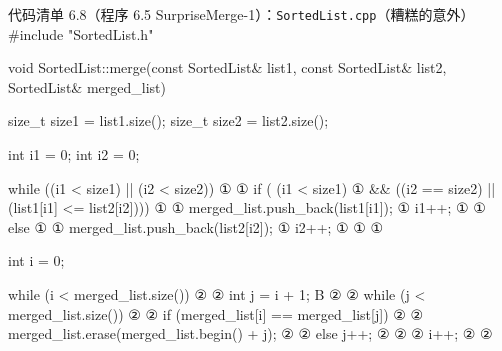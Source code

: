 \begin{codeboxt}{代码清单 6.8（程序 6.5 SurpriseMerge-1）：\texttt{Sorted\allowbreak{}List.\allowbreak{}cpp}（糟糕的意外）}
#include "SortedList.h"

void SortedList::merge(const SortedList& list1,
                       const SortedList& list2,
                             SortedList& merged_list)
{
    size_t size1 = list1.size();
    size_t size2 = list2.size();

    int i1 = 0;
    int i2 = 0;

    while ((i1 < size1) || (i2 < size2))                       ①
    {                                                          ①
        if (   (i1 < size1)                                    ①
            && ((i2 == size2) || (list1[i1] <= list2[i2])))    ①
        {                                                      ①
            merged_list.push_back(list1[i1]);                  ①
            i1++;                                              ①
        }                                                      ①
        else                                                   ①
        {                                                      ①
            merged_list.push_back(list2[i2]);                  ①
            i2++;                                              ①
        }                                                      ①
    }                                                          ①

    int i = 0;

    while (i < merged_list.size())                             ②
    {                                                          ②
        int j = i + 1;    B                                    ②
                                                               ②
        while (j < merged_list.size())                         ②
        {                                                      ②
            if (merged_list[i] == merged_list[j])              ②
            {                                                  ②
                merged_list.erase(merged_list.begin() + j);    ②
            }                                                  ②
            else j++;                                          ②
        }                                                      ②
                                                               ②
        i++;                                                   ②
    }                                                          ②
}
\end{codeboxt}
\par
{}\par

